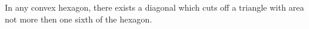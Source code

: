 In any convex hexagon, there exists a diagonal which cuts off a triangle with area not more then one sixth of the hexagon.
